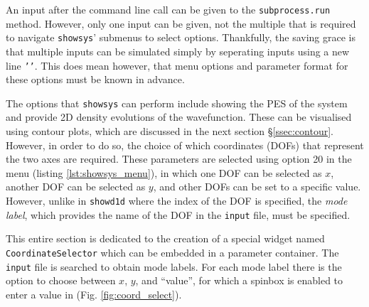 \documentclass[12pt]{article}
\begin{document}
An input after the command line call can be given to the \texttt{subprocess.run} method. However, only one input can be given, not the multiple that is required to navigate \texttt{showsys}' submenus to select options. Thankfully, the saving grace is that multiple inputs can be simulated simply by seperating inputs using a new line \texttt{'\n'}. This does mean however, that menu options and parameter format for these options must be known in advance.

The options that \texttt{showsys} can perform include showing the PES of the system and provide 2D density evolutions of the wavefunction. These can be visualised using contour plots, which are discussed in the next section \S\ref{ssec:contour}. However, in order to do so, the choice of which coordinates (DOFs) that represent the two axes are required. These parameters are selected using option 20 in the menu (listing \ref{lst:showsys_menu}), in which one DOF can be selected as \(x\), another DOF can be selected as \(y\), and other DOFs can be set to a specific value. However, unlike in \texttt{showd1d} where the index of the DOF is specified, the \textit{mode label}, which provides the name of the DOF in the \texttt{input} file, must be specified.

This entire section is dedicated to the creation of a special widget named \texttt{CoordinateSelector} which can be embedded in a parameter container. The \texttt{input} file is searched to obtain mode labels. For each mode label there is the option to choose between \(x\), \(y\), and ``value'', for which a spinbox is enabled to enter a value in (Fig. \ref{fig:coord_select}).
\end{document}
